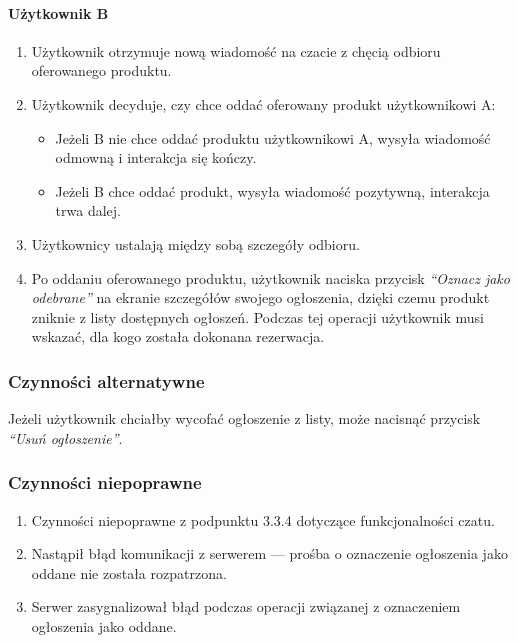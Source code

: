 \documentclass[licencjacka]{pracamgr}
\begin{document}
    \paragraph{Użytkownik B}
    \begin{enumerate}
        \item Użytkownik otrzymuje nową wiadomość na czacie z chęcią odbioru oferowanego produktu.
        \item Użytkownik decyduje, czy chce oddać oferowany produkt użytkownikowi A:
        \begin{itemize}
            \item Jeżeli B nie chce oddać produktu użytkownikowi A, wysyła wiadomość odmowną i interakcja się kończy.
            \item Jeżeli B chce oddać produkt, wysyła wiadomość pozytywną, interakcja trwa dalej.
        \end{itemize}
        \item Użytkownicy ustalają między sobą szczegóły odbioru.
        \item Po oddaniu oferowanego produktu, użytkownik naciska przycisk \textit{``Oznacz jako odebrane''} na ekranie szczegółów swojego ogłoszenia, dzięki czemu produkt zniknie z listy dostępnych ogłoszeń. Podczas tej operacji użytkownik musi wskazać, dla kogo została dokonana rezerwacja.
    \end{enumerate}
    \subsubsection{Czynności alternatywne}
    Jeżeli użytkownik chciałby wycofać ogłoszenie z listy, może nacisnąć przycisk \textit{``Usuń ogłoszenie''}.
    \subsubsection{Czynności niepoprawne}
    \begin{enumerate}
        \item Czynności niepoprawne z podpunktu 3.3.4 dotyczące funkcjonalności czatu.
        \item Nastąpił błąd komunikacji z serwerem --- prośba o oznaczenie ogłoszenia jako oddane nie została rozpatrzona.
        \item Serwer zasygnalizował błąd podczas operacji związanej z oznaczeniem ogłoszenia jako oddane.
    \end{enumerate}
\end{document}
